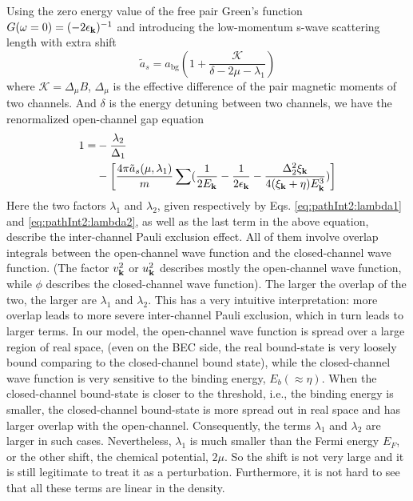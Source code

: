 \documentclass[reprint,pra]{revtex4-1}
\begin{document}
Using the zero energy value of the free pair Green's function $G(\omega=0)=(-2\epsilon_{\mathbf{k}})^{-1}$ and introducing the low-momentum s-wave scattering length with extra shift 
\begin{equation}\label{eq:pathInt2:asKshift}
\tilde{a}_s=a_{\text{bg}}(1+\frac{\mathcal{K}}{\delta-2\mu-\lambda_{1}})
\end{equation}
where $\mathcal{K}=\Delta_{\mu}B$, $\Delta_{\mu}$ is the  effective difference of the pair magnetic moments of two channels. And  $\delta$ is the energy detuning between two channels, we have the renormalized open-channel gap equation
\begin{equation}
\begin{split}\label{eq:pathInt2:gapRenorm}
1=&-\frac{\lambda_{2}}{\Delta_{1}}\\
&-\left[\frac{4\pi{\tilde{a}_{s}(\mu,\lambda_{1})}}{m}\sum(\frac{1}{2E_{\mathbf{k}}}-\frac{1}{2\epsilon_{\mathbf{k}}}-\frac{\Delta_{2}^{2}\xi_{\mathbf{k}}}{4(\xi_{\mathbf{k}}+\eta){E_{\mathbf{k}}^{3}}})\right]
	\\
\end{split}	
\end{equation}
Here the two factors $\lambda_1$ and $\lambda_2$, given respectively by Eqs. \eqref{eq:pathInt2:lambda1} and \eqref{eq:pathInt2:lambda2}, as well as the last term in the above equation, describe the inter-channel Pauli exclusion effect. All of them involve overlap integrals between the open-channel wave function and the closed-channel wave function.  (The factor $v_{\mathbf{k}}^{2}$ or $u_{\mathbf{k}}^{2}$ describes mostly the open-channel wave function, while $\phi$ describes the closed-channel wave function). The larger the overlap of the two, the larger are $\lambda_1$ and $\lambda_2$.  This has a very intuitive interpretation:  more overlap leads to more severe inter-channel Pauli exclusion, which in turn leads to larger terms.  In our model, the open-channel wave function is  spread  over  a large region of  real space, (even on the BEC side, the real bound-state is very loosely bound comparing to the closed-channel bound state), while the closed-channel wave function is very sensitive to the binding energy, $E_{b}(\approx\eta)$.  When the closed-channel  bound-state is closer to the threshold, i.e.,  the binding energy  is smaller, the closed-channel bound-state is more spread out  in real space and has larger overlap with the open-channel. Consequently,  the terms $\lambda_1$ and $\lambda_2$ are larger in such cases.                           Nevertheless, $\lambda_1$ is much smaller than the  Fermi energy $E_{F}$, or the other shift, the chemical potential, $2\mu$.  So the shift is not very large and it is still legitimate to treat it as a perturbation.  Furthermore, it is not hard to see that all these terms are linear in the density.
\end{document}
